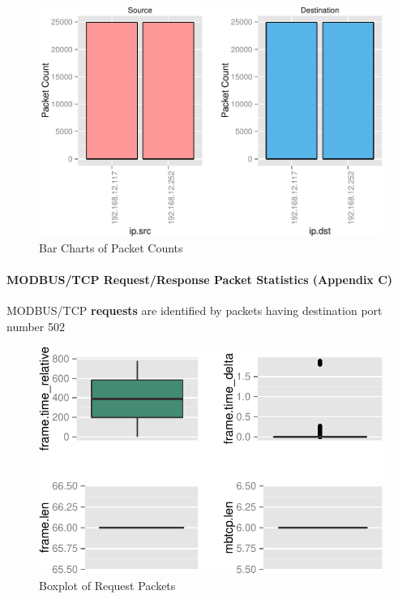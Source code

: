 \documentclass[12pt,]{article}
\begin{document}
\begin{figure}

{\centering \includegraphics{thesis_files/figure-latex/unnamed-chunk-21-1} 

}

\caption{Bar Charts of Packet Counts}\label{fig:unnamed-chunk-21}
\end{figure}

\paragraph{MODBUS/TCP Request/Response Packet Statistics (Appendix
C)}\label{modbustcp-requestresponse-packet-statistics-appendix-c}

\medskip

MODBUS/TCP \textbf{requests} are identified by packets having
destination port number 502

\begin{figure}

{\centering \includegraphics{thesis_files/figure-latex/unnamed-chunk-24-1} 

}

\caption{Boxplot of Request Packets}\label{fig:unnamed-chunk-24}
\end{figure}
\end{document}
